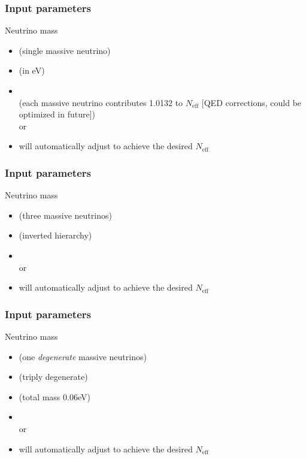 \begin{frame}[fragile]
	\frametitle{Input parameters}
	Neutrino mass
	\begin{itemize}
		\item {} (single massive neutrino)
		\item {} (in eV)
		\item {} \\
		(each massive neutrino contributes 1.0132 to $N_\mathrm{eff}$ [QED corrections, could be optimized in future])\\
		or
		\item {} will automatically adjust  to achieve the desired $N_\text{eff}$
	\end{itemize}
\end{frame}


\begin{frame}[fragile]
	\frametitle{Input parameters}
	Neutrino mass
	\begin{itemize}
		\item {} (three massive neutrinos)
		\item {} (inverted hierarchy)
		\item {}\\
		or
		\item {} will automatically adjust  to achieve the desired $N_\text{eff}$
	\end{itemize}
\end{frame}

\begin{frame}[fragile]
	\frametitle{Input parameters}
	Neutrino mass
	\begin{itemize}
		\item {} (one \textit{degenerate} massive neutrinos)
		\item {} (triply degenerate)
		\item {} (total mass 0.06eV)
		\item {} \\
		or
		\item {} will automatically adjust  to achieve the desired $N_\text{eff}$
	\end{itemize}
\end{frame}

